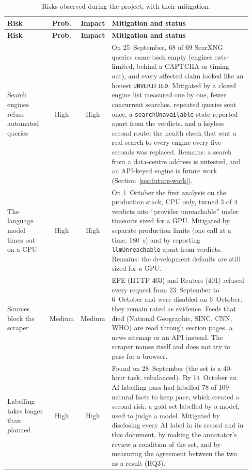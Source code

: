 {\small
\begin{longtable}{@{}p{3.4cm}ccp{8.2cm}@{}}
\caption{Risks observed during the project, with their mitigation.}
\label{tab:risks} \\
\toprule
\textbf{Risk} & \textbf{Prob.} & \textbf{Impact} & \textbf{Mitigation and status} \\
\midrule
\endfirsthead
\toprule
\textbf{Risk} & \textbf{Prob.} & \textbf{Impact} & \textbf{Mitigation and status} \\
\midrule
\endhead
\bottomrule
\endfoot
Search engines refuse automated queries & High & High & On
25~September, 68 of 69 SearXNG queries came back empty (engines
rate-limited, behind a CAPTCHA or timing out), and every affected claim
looked like an honest \texttt{UNVERIFIED}. Mitigated by a closed engine
list measured one by one, fewer concurrent searches, repeated queries
sent once, a \texttt{searchUnavailable} state reported apart from the
verdicts, and a keyless second route; the health check that sent a
real search to every engine every five seconds was replaced. Remains: a
search from a data-centre address is untested, and an API-keyed engine
is future work (Section~\ref{sec:future-work}). \\
\addlinespace
The language model times out on a CPU & High & High & On 1~October
the first analysis on the production stack, CPU only, turned 3 of 4
verdicts into ``provider unreachable'' under timeouts sized for a GPU.
Mitigated by separate production limits (one call at a time, 180~s)
and by reporting \texttt{llmUnreachable} apart from verdicts. Remains:
the development defaults are still sized for a GPU. \\
\addlinespace
Sources block the scraper & Medium & Medium & EFE (HTTP 403) and
Reuters (401) refused every request from 23~September to 6~October and
were disabled on 6~October; they remain rated as evidence. Feeds that
died (National Geographic, SINC, CNN, WHO) are read through section
pages, a news sitemap or an API instead. The scraper names itself and
does not try to pass for a browser. \\
\addlinespace
Labelling takes longer than planned & High & High & Found on
28~September (the set is a 40-hour task, rebalanced). By 14~October an
AI labelling pass had labelled 78 of 109 natural facts to keep pace,
which created a second risk: a gold set labelled by a model, used to
judge a model. Mitigated by disclosing every AI label in its record and
in this document, by making the annotator's review a condition of the
set, and by measuring the agreement between the two as a result (RQ3).

\end{longtable}}
